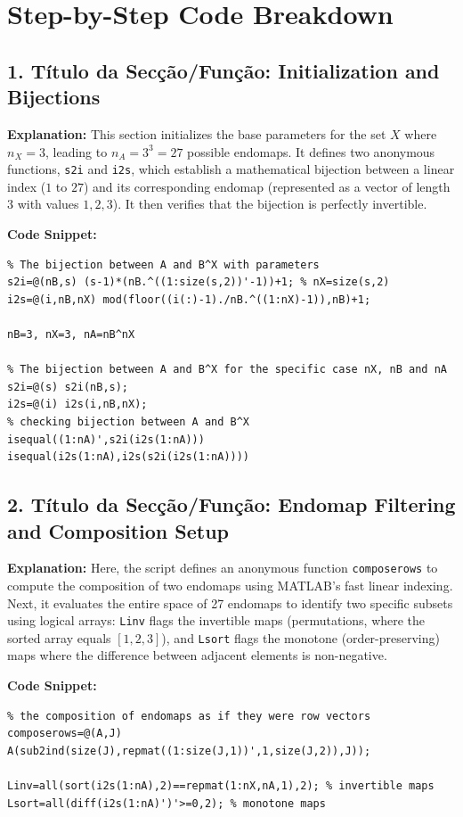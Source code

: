 \newpage
\section{Step-by-Step Code Breakdown}

\subsection{1. Título da Secção/Função: Initialization and Bijections}
\textbf{Explanation:} 
This section initializes the base parameters for the set $X$ where $n_X = 3$, leading to $n_A = 3^3 = 27$ possible endomaps. It defines two anonymous functions, \texttt{s2i} and \texttt{i2s}, which establish a mathematical bijection between a linear index ($1$ to $27$) and its corresponding endomap (represented as a vector of length 3 with values $1, 2, 3$). It then verifies that the bijection is perfectly invertible.

\textbf{Code Snippet:}
\begin{lstlisting}
% The bijection between A and B^X with parameters
s2i=@(nB,s) (s-1)*(nB.^((1:size(s,2))'-1))+1; % nX=size(s,2)
i2s=@(i,nB,nX) mod(floor((i(:)-1)./nB.^((1:nX)-1)),nB)+1; 

nB=3, nX=3, nA=nB^nX

% The bijection between A and B^X for the specific case nX, nB and nA
s2i=@(s) s2i(nB,s); 
i2s=@(i) i2s(i,nB,nX);
% checking bijection between A and B^X
isequal((1:nA)',s2i(i2s(1:nA)))
isequal(i2s(1:nA),i2s(s2i(i2s(1:nA))))
\end{lstlisting}

\subsection{2. Título da Secção/Função: Endomap Filtering and Composition Setup}
\textbf{Explanation:} 
Here, the script defines an anonymous function \texttt{composerows} to compute the composition of two endomaps using MATLAB's fast linear indexing. Next, it evaluates the entire space of 27 endomaps to identify two specific subsets using logical arrays: \texttt{Linv} flags the invertible maps (permutations, where the sorted array equals $[1, 2, 3]$), and \texttt{Lsort} flags the monotone (order-preserving) maps where the difference between adjacent elements is non-negative.

\textbf{Code Snippet:}
\begin{lstlisting}
% the composition of endomaps as if they were row vectors
composerows=@(A,J) A(sub2ind(size(J),repmat((1:size(J,1))',1,size(J,2)),J)); 

Linv=all(sort(i2s(1:nA),2)==repmat(1:nX,nA,1),2); % invertible maps
Lsort=all(diff(i2s(1:nA)')'>=0,2); % monotone maps
\end{lstlisting}

